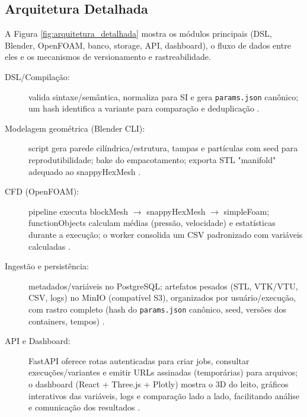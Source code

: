 
\subsection{Arquitetura Detalhada}

A Figura \ref{fig:arquitetura_detalhada} mostra os módulos principais (DSL, Blender, OpenFOAM, banco, storage, API, dashboard), o fluxo de dados entre eles e os mecanismos de versionamento e rastreabilidade.


\begin{description}
    \item[DSL/Compilação:] valida sintaxe/semântica, normaliza para SI e gera \texttt{params.json} canônico; um hash identifica a variante para comparação e deduplicação \cite{fowler2010}.
    
    \item[Modelagem geométrica (Blender CLI):] script gera parede cilíndrica/estrutura, tampas e partículas com seed para reprodutibilidade; bake do empacotamento; exporta STL "manifold" adequado ao snappyHexMesh \cite{blender2021}.
    
    \item[CFD (OpenFOAM):] pipeline executa blockMesh $\rightarrow$ snappyHexMesh $\rightarrow$ simpleFoam; functionObjects calculam médias (pressão, velocidade) e estatísticas durante a execução; o worker consolida um CSV padronizado com variáveis calculadas \cite{openfoam2023, versteeg2007}.
    
    \item[Ingestão e persistência:] metadados/variáveis no PostgreSQL; artefatos pesados (STL, VTK/VTU, CSV, logs) no MinIO (compatível S3), organizados por usuário/execução, com rastro completo (hash do \texttt{params.json} canônico, seed, versões dos containers, tempos) \cite{postgresql2023, minio2021, docker2021}.
    
    \item[API e Dashboard:] FastAPI oferece rotas autenticadas para criar jobs, consultar execuções/variantes e emitir URLs assinadas (temporárias) para arquivos; o dashboard (React + Three.js + Plotly) mostra o 3D do leito, gráficos interativos das variáveis, logs e comparação lado a lado, facilitando análise e comunicação dos resultados \cite{fastapi2021, react2021, threejs2021, plotly2021}.
\end{description}

